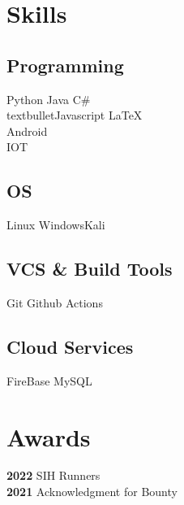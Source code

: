 \documentclass[]{deedy-resume-openfont}
\begin{document}
\begin{minipage}[t]{0.33\textwidth} 


\section{Skills}
\subsection{Programming}
Python \textbullet{} Java \textbullet{} C\#\\textbullet{}Javascript\textbullet{} \LaTeX\ \\ 
 \textbullet{}Android   \\
 \textbullet{}IOT  \\
\subsection{OS}
\textbullet{}Linux \textbullet{}Windows\textbullet{}Kali

\subsection{VCS \& Build Tools}
\textbullet{}Git  \textbullet{} Github Actions
\subsection{Cloud Services}
\textbullet{}FireBase \textbullet{}MySQL
\sectionsep


\section{Awards} 

\textbf{2022 } SIH Runners \\
\textbf{2021 } Acknowledgment for Bounty \\




\end{minipage}
\end{document}
